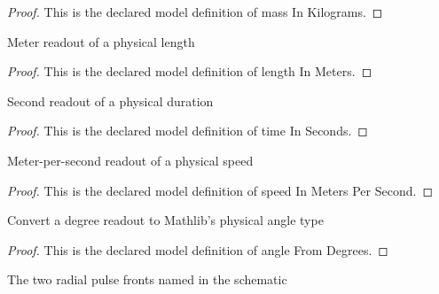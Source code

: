\begin{proof}
  This is the declared model definition of mass In Kilograms.
\end{proof}
\begin{definition}
  \label{def:physics:phyx-mini-0304:phyxminiproblems-problemphyxmini0304-lengthinmeters}
  Meter readout of a physical length
\end{definition}
\begin{proof}
  This is the declared model definition of length In Meters.
\end{proof}
\begin{definition}
  \label{def:physics:phyx-mini-0304:phyxminiproblems-problemphyxmini0304-timeinseconds}
  Second readout of a physical duration
\end{definition}
\begin{proof}
  This is the declared model definition of time In Seconds.
\end{proof}
\begin{definition}
  \label{def:physics:phyx-mini-0304:phyxminiproblems-problemphyxmini0304-speedinmeterspersecond}
  Meter-per-second readout of a physical speed
\end{definition}
\begin{proof}
  This is the declared model definition of speed In Meters Per Second.
\end{proof}
\begin{definition}
  \label{def:physics:phyx-mini-0304:phyxminiproblems-problemphyxmini0304-anglefromdegrees}
  Convert a degree readout to Mathlib's physical angle type
\end{definition}
\begin{proof}
  This is the declared model definition of angle From Degrees.
\end{proof}
\begin{definition}
  \label{def:physics:phyx-mini-0304:phyxminiproblems-problemphyxmini0304-pulsekind}
  The two radial pulse fronts named in the schematic
\end{definition}
